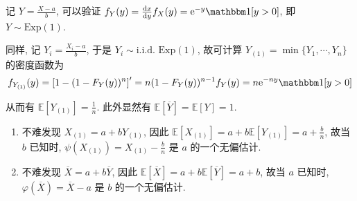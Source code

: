 \documentclass[8pt]{article}
\theoremstyle{compact}
\def\e{\mathrm{e}}
\def\E#1{\mathbb{E}\left[{#1}\right]}
\begin{document}
\section{}
记 $Y = \frac{X - a}{b}$, 可以验证 $f_Y(y) = \frac{\text dx}{\text dy}f_X(y) = \e^{-y}\mathbbm 1[y > 0]$, 即 $Y \sim \text{Exp}(1)$.

同样, 记 $Y_i = \frac{X_i - a}{b}$, 于是 $Y_i \sim \text{i.i.d. Exp}(1)$, 故可计算 $Y_{(1)} = \min\{Y_1, \cdots, Y_n\}$ 的密度函数为 $$f_{Y_{(1)}}(y) = \left[1 - (1 - F_Y(y))^n \right]' = n(1 - F_Y(y))^{n-1}f_Y(y) = n\e^{-ny}\mathbbm 1[y > 0]$$

从而有 $\E{Y_{(1)}} = \frac1n$. 此外显然有 $\E{\overline{Y}} = \E{Y} = 1$.

\begin{enumerate}
	\item 不难发现 $X_{(1)} = a + bY_{(1)}$, 因此 $\E{X_{(1)}} = a + b\E{Y_{(1)}} = a + \frac{b}{n}$, 故当 $b$ 已知时, $\psi(X_{(1)}) = X_{(1)} - \frac bn$ 是 $a$ 的一个无偏估计.
 \item 不难发现 $\overline{X} = a + b\overline{Y}$, 因此 $\E{\overline{X}} = a + b\E{\overline{Y}} = a + b$, 故当 $a$ 已知时, $\varphi(\overline{X}) = \overline{X} - a$ 是 $b$ 的一个无偏估计.
\end{enumerate}
\end{document}
